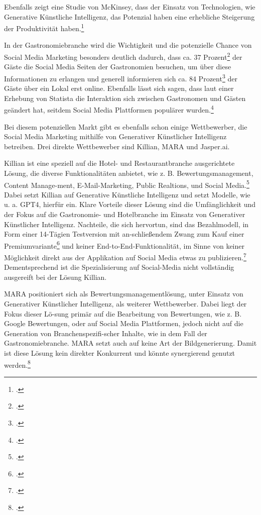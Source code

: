 Ebenfalls zeigt eine Studie von McKinsey, dass der Einsatz von Technologien, wie Generative Künstliche Intelligenz, das Potenzial haben eine erhebliche Steigerung der Produktivität haben.\footcite{mckinsey_genai_marketing}

In der Gastronomiebranche wird die Wichtigkeit und die potenzielle Chance von Social Media Marketing besonders deutlich dadurch, dass ca. 37 Prozent\footcite{apicbase_gastro_fakten} der Gäste die Social Media Seiten der Gastronomien besuchen, um über diese Informationen zu erlangen und generell informieren sich ca. 84 Prozent\footcite{g_wie_gastro_trends_2024} der Gäste über ein Lokal erst online.
Ebenfalls lässt sich sagen, dass laut einer Erhebung von Statista die Interaktion sich zwischen Gastronomen und Gästen geändert hat, seitdem Social Media Plattformen populärer wurden.\footcite{statista_social_media_gastgewerbe}

Bei diesem potenziellen Markt gibt es ebenfalls schon einige Wettbewerber, die Social Media Marketing mithilfe von Generativer Künstlicher Intelligenz betreiben.
Drei direkte Wettbewerber sind Killian, MARA und Jasper.ai.

Killian ist eine speziell auf die Hotel- und Restaurantbranche ausgerichtete Lösung, die diverse Funktionalitäten anbietet, wie z. B. Bewertungsmanagement, Content Manage-ment, E-Mail-Marketing, Public Realtions, und Social Media.\footcite{kilian_ai_produkt}
Dabei setzt Killian auf Generative Künstliche Intelligenz und setzt Modelle, wie u. a. GPT4, hierfür ein.
Klare Vorteile dieser Lösung sind die Umfänglichkeit und der Fokus auf die Gastronomie- und Hotelbranche im Einsatz von Generativer Künstlicher Intelligenz.
Nachteile, die sich hervortun, sind das Bezahlmodell, in Form einer 14-Tägien Testversion mit an-schließendem Zwang zum Kauf einer Premiumvariante\footcite{kilian_ai_preise} und keiner End-to-End-Funktionalität, im Sinne von keiner Möglichkeit direkt aus der Applikation auf Social Media etwas zu publizieren.\footcite{kilian_ai_funktionen}
Dementsprechend ist die Spezialisierung auf Social-Media nicht vollständig ausgereift bei der Lösung Killian.

MARA positioniert sich als Bewertungsmanagementlösung, unter Einsatz von Generativer Künstlicher Intelligenz, als weiterer Wettbewerber.
Dabei liegt der Fokus dieser Lö-sung primär auf die Bearbeitung von Bewertungen, wie z. B. Google Bewertungen, oder auf Social Media Plattformen, jedoch nicht auf die Generation von Branchenspezifi-scher Inhalte, wie in dem Fall der Gastronomiebranche.
MARA setzt auch auf keine Art der Bildgenerierung.
Damit ist diese Lösung kein direkter Konkurrent und könnte synergierend genutzt werden.\footcite{mara_solutions_features}

